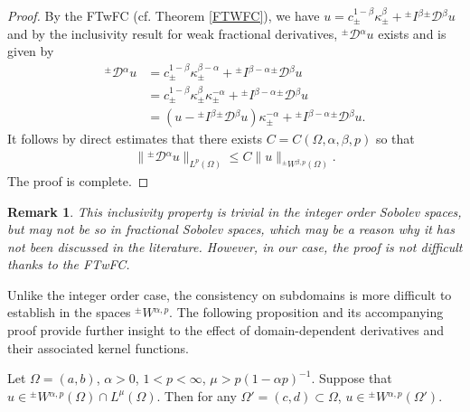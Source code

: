 \documentclass[leqno,final]{siamltex}
\numberwithin{equation}{section}
\newtheorem{remark}{Remark}[section]
\renewcommand{\(}{\bigl(}
\renewcommand{\)}{\bigr)}
\begin{document}
    \begin{proof}
        By the FTwFC (cf. Theorem \ref{FTWFC}), we have
            $u = c^{1-\beta}_{\pm} \kappa^{\beta}_{\pm} + {^{\pm}}{I}{^{\beta}} {^{\pm}}{\mathcal{D}}{^{\beta}}u$
        and by the inclusivity result for weak fractional derivatives, 
        ${^{\pm}}{\mathcal{D}}{^{\alpha}}u$ exists and is given by 
        \begin{align*}
            {^{\pm}}{\mathcal{D}}{^{\alpha}} u &= c^{1-\beta}_{\pm} \kappa^{\beta - \alpha}_{\pm} + {^{\pm}}{I}{^{\beta - \alpha}} {^{\pm}}{\mathcal{D}}{^{\beta}} u  \\
            &= c^{1-\beta}_{\pm} \kappa^{\beta}_{\pm} \kappa^{-\alpha}_{\pm} + {^{\pm}}{I}{^{\beta - \alpha}}{^{\pm}}{\mathcal{D}}{^{\beta}} u \\ 
            &= ( u - {^{\pm}}{I}{^{\beta}} {^{\pm}}{\mathcal{D}}{^{\beta}} u ) \kappa^{-\alpha}_{\pm} + {^{\pm}}{I}{^{\beta - \alpha}} {^{\pm}}{\mathcal{D}}{^{\beta}} u.
        \end{align*}
        It follows by direct estimates that there exists $C  = C(\Omega , \alpha ,\beta , p)$ so that 
        \begin{align*}
            \|{^{\pm}}{\mathcal{D}}{^{\alpha}} u \|_{L^{p}(\Omega)} \leq C \| u \|_{{^{\pm}}{W}{^{\beta,p}}(\Omega)}. 
        \end{align*}
        The proof is complete. 
    \end{proof}
    
    \begin{remark}
        This inclusivity property is trivial in the integer order Sobolev spaces, but may not be so in 
        fractional Sobolev spaces, which may be a reason why it has not been discussed in the literature.  
        However, in our case, the proof is not difficult thanks to the FTwFC. 
    \end{remark}
    
    Unlike the integer order case, the consistency on subdomains is more difficult to establish 
    in the spaces ${^{\pm}}{W}{^{\alpha,p}}$. The following proposition and its accompanying proof 
    provide further insight to the effect of domain-dependent derivatives and their associated kernel functions.
    
    \begin{proposition}
        Let $\Omega =(a,b)$, $\alpha > 0$, $1 < p < \infty$, $\mu > p(1- \alpha p)^{-1}$.
        Suppose that $u \in {^{\pm}}{W}{^{\alpha,p}}(\Omega) \cap L^{\mu}(\Omega)$. Then for any $\Omega'=(c,d) \subset \Omega$, $u \in {^{\pm}}{W}{^{\alpha,p}}(\Omega')$.
    \end{proposition}
    
\end{document}
